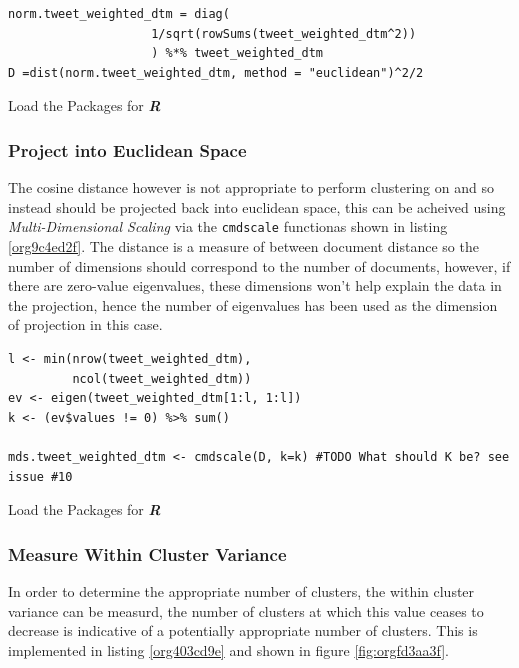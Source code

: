 \documentclass[11pt]{article}
\begin{document}
\begin{listing}[htbp]
\begin{verbatim}
norm.tweet_weighted_dtm = diag(
                    1/sqrt(rowSums(tweet_weighted_dtm^2))
                    ) %*% tweet_weighted_dtm
D =dist(norm.tweet_weighted_dtm, method = "euclidean")^2/2
\end{verbatim}
\caption{\label{org68a6527}Load the Packages for \textbf{\textbf{\emph{R}}}}
\end{listing}

\subsubsection{Project into Euclidean Space}
\label{sec:org825ea65}
The cosine distance however is not appropriate to perform clustering on and so instead should be projected back into euclidean space, this can be acheived using \emph{Multi-Dimensional Scaling} via the \texttt{cmdscale} functionas shown in listing \ref{org9c4ed2f}. The distance is a measure of between document distance so the number of dimensions should correspond to the number of documents, however, if there are zero-value eigenvalues, these dimensions won't help explain the data in the projection, hence the number of eigenvalues has been used as the dimension of projection in this case.

\begin{listing}[htbp]
\begin{verbatim}
l <- min(nrow(tweet_weighted_dtm),
         ncol(tweet_weighted_dtm))
ev <- eigen(tweet_weighted_dtm[1:l, 1:l])
k <- (ev$values != 0) %>% sum()

mds.tweet_weighted_dtm <- cmdscale(D, k=k) #TODO What should K be? see issue #10
\end{verbatim}
\caption{\label{org9c4ed2f}Load the Packages for \textbf{\textbf{\emph{R}}}}
\end{listing}

\subsubsection{Measure Within Cluster Variance}
\label{sec:org938707d}
In order to determine the appropriate number of clusters, the within cluster
variance can be measurd, the number of clusters at which this value ceases to
decrease is indicative of a potentially appropriate number of clusters. This is
implemented in listing \ref{org403cd9e} and shown in figure \ref{fig:orgfd3aa3f}.
\end{document}
